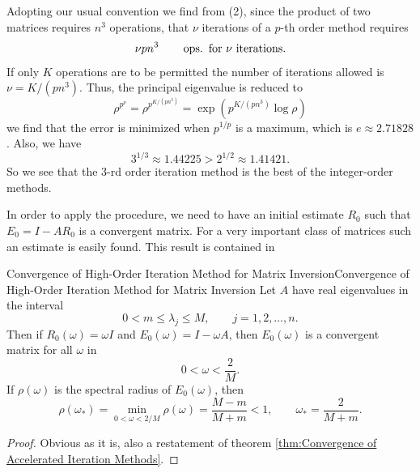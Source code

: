\documentclass[../main.tex]{subfiles}
\begin{document}
Adopting our usual convention we find from (2), since the product of two matrices requires $n^3$ operations, that $\nu$ iterations of a $p$-th order method requires 
\begin{equation*}
	\nu p n^3 \qquad \operatorname{ops.} \text{ for $\nu$ iterations.}
\end{equation*}
If only $K$ operations are to be permitted the number of iterations allowed is $\nu = K / (p n^3)$. Thus, the principal eigenvalue is reduced to
\begin{equation*}
	\rho^{p^{\nu}} = \rho^{p^{K / (p n^3)}} = \exp \left( p^{K / (p n^3)} \log \rho \right) 
\end{equation*}
we find that the error is minimized when $p^{1/ p}$ is a maximum, which is $e \approx 2.71828$. Also, we have
\begin{equation*}
	3^{1/3} \approx 1.44225 > 2^{1/2} \approx 1.41421.
\end{equation*}
So we see that the $3$-rd order iteration method is the best of the integer-order methods.

In order to apply the procedure, we need to have an initial estimate $R_0$ such that $E_0 = I - A R_0$ is a convergent matrix. For a very important class of matrices such an estimate is easily found. This result is contained in

\begin{theorem}{Convergence of High-Order Iteration Method for Matrix Inversion}{Convergence of High-Order Iteration Method for Matrix Inversion}
	Let $A$ have real eigenvalues in the interval
	\begin{equation*}
		0 < m \leq \lambda_j \leq M, \qquad j = 1,2, \ldots ,n.
	\end{equation*}
	Then if $R_0(\omega) = \omega I$ and $E_0(\omega) = I - \omega A$, then $E_0(\omega)$ is a convergent matrix for all $\omega$ in
	\begin{equation}
		0 < \omega < \frac{2}{M}.
	\end{equation}
	If $\rho(\omega)$ is the spectral radius of $E_0(\omega)$, then
	\begin{equation}
		\rho(\omega_*) = \min_{0 < \omega < 2 / M} \rho(\omega) = \frac{M - m}{M + m} < 1, \qquad \omega_* = \frac{2}{M + m}.
	\end{equation}
\end{theorem}
\begin{proof}
	Obvious as it is, also a restatement of theorem \ref{thm:Convergence of Accelerated Iteration Methods}.
\end{proof}
\end{document}
